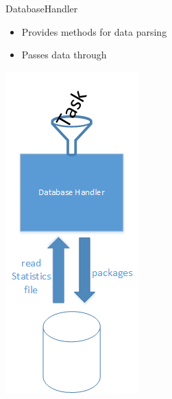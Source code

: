 	\begin{frame}{DatabaseHandler}
	
	\begin{minipage}[]{.5\textwidth}%
	\begin{itemize}
		\item<1->{} {Provides methods for data parsing}
		\item<2->{} {Passes data through}
	\end{itemize}
	\end{minipage}	
	\begin{minipage}[]{.25\textwidth}%
	\vspace{-\ht\strutbox}\includegraphics[width=\textwidth]{images/zeichnunghandler.png}
	\end{minipage}%
	

\end{frame}
